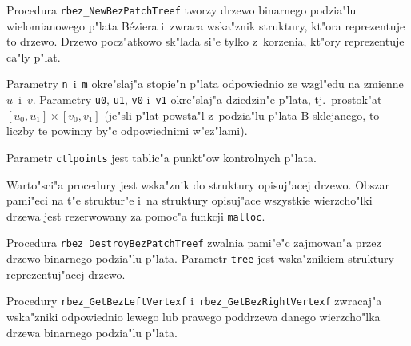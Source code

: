 \newpage
Procedura \texttt{rbez\_NewBezPatchTreef} tworzy drzewo binarnego podzia"lu
wielomianowego p"lata B\'{e}ziera i~zwraca wska"znik struktury, kt"ora
reprezentuje to drzewo. Drzewo pocz"atkowo sk"lada si"e tylko z~korzenia,
kt"ory reprezentuje ca"ly p"lat.

Parametry \texttt{n}~i~\texttt{m} okre"slaj"a stopie"n p"lata odpowiednio ze
wzgl"edu na zmienne $u$~i~$v$. Parametry \texttt{u0}, \texttt{u1},
\texttt{v0} i~\texttt{v1} okre"slaj"a dziedzin"e p"lata, tj.~prostok"at
$[u_0,u_1]\times[v_0,v_1]$ (je"sli p"lat powsta"l z~podzia"lu p"lata
B-sklejanego, to liczby te powinny by"c odpowiednimi w"ez"lami).

Parametr \texttt{ctlpoints} jest tablic"a punkt"ow kontrolnych p"lata.

Warto"sci"a procedury jest wska"znik do struktury opisuj"acej drzewo.
Obszar pami"eci na t"e struktur"e i~na struktury opisuj"ace wszystkie
wierzcho"lki drzewa jest rezerwowany za pomoc"a funkcji \texttt{malloc}.

\vspace{\bigskipamount}
Procedura \texttt{rbez\_DestroyBezPatchTreef} zwalnia pami"e"c zajmowan"a przez
drze\-wo binarnego podzia"lu p"lata. Parametr \texttt{tree} jest wska"znikiem
struktury re\-pre\-zen\-tu\-j"a\-cej drzewo.

\vspace{\bigskipamount}
\begin{sloppypar}
Procedury \texttt{rbez\_GetBezLeftVertexf} i~\texttt{rbez\_GetBezRightVertexf}
zwracaj"a wska"zniki odpowiednio lewego lub prawego poddrzewa danego
wierzcho"lka drzewa binarnego podzia"lu p"lata.%
\end{sloppypar}

